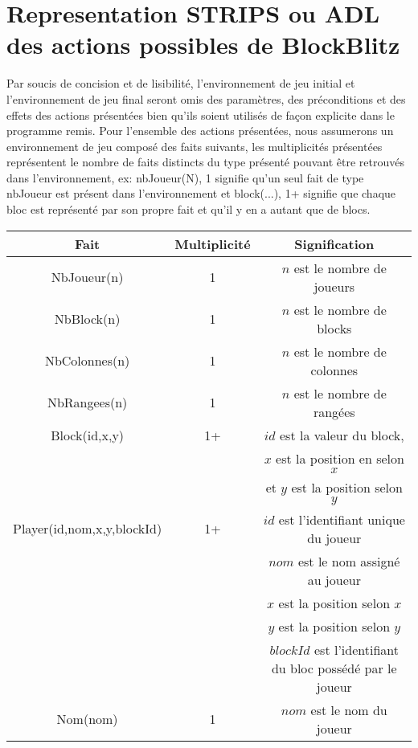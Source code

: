 \documentclass[12pt,english,frenchb,letterpaper]{article}
\begin{document}


\section{Representation STRIPS ou ADL des actions possibles de BlockBlitz}
Par soucis de concision et de lisibilité, l'environnement de jeu initial et l'environnement de jeu final seront omis des paramètres, des préconditions et des effets des actions présentées bien qu'ils soient utilisés de fa\c con explicite dans le programme remis.  Pour l'ensemble des actions présentées, nous assumerons un environnement de jeu composé des faits suivants, les multiplicités présentées représentent le nombre de faits distincts du type présenté pouvant être retrouvés dans l'environnement, ex: nbJoueur(N), 1 signifie qu'un seul fait de type nbJoueur est présent dans l'environnement et block(...), 1+ signifie que chaque bloc est représenté par son propre fait et qu'il y en a autant que de blocs.

\begin{center}
  \begin{tabular}{@{} ccc @{}}
    \hline
    Fait & Multiplicité & Signification \\ 
    \hline
    NbJoueur(n) & 1 & $n$ est le nombre de joueurs \\ 
    NbBlock(n) & 1 & $n$ est le nombre de blocks \\ 
    NbColonnes(n) & 1 & $n$ est le nombre de colonnes \\ 
    NbRangees(n) & 1 & $n$ est le nombre de rangées \\ 
    Block(id,x,y) & 1+ & $id$ est la valeur du block, \\
                                  && $x$ est la position en selon $x$ \\
                                  && et $y$ est la position selon $y$ \\ 
    Player(id,nom,x,y,blockId) & 1+ & $id$ est l'identifiant unique du joueur \\
                                                              && $nom$ est le nom assigné au joueur \\ 
                                                              && $x$ est la position selon $x$ \\
                                                              && $y$ est la position selon $y$ \\
                                                              && $blockId$ est l'identifiant du bloc possédé par le joueur\\
    Nom(nom) & 1 & $nom$ est le nom du joueur \\ 
    \hline
  \end{tabular}
\end{center}
\end{document}

